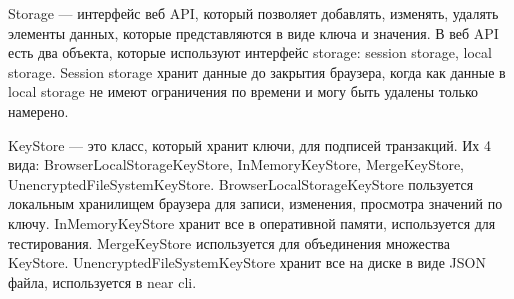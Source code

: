 \begin{figure}[H]
	\centering
    \caption{}
\end{figure}

\begin{definition}
    Storage --- интерфейс веб API, который позволяет добавлять, изменять, удалять элементы данных, которые представляются в виде ключа и значения\cite{webapistorage}. В веб API есть два объекта, которые используют интерфейс storage: session storage, local storage\cite{webapilocalstorage}. Session storage хранит данные до закрытия браузера, когда как данные в local storage не имеют ограничения по времени и могу быть удалены только намерено.
\end{definition}

\begin{definition}
    KeyStore\cite{nearclasskeystore} --- это класс, который хранит ключи, для подписей транзакций. Их 4 вида: BrowserLocalStorageKeyStore, InMemoryKeyStore, MergeKeyStore, UnencryptedFileSystemKeyStore. BrowserLocalStorageKeyStore пользуется локальным хранилищем браузера для записи, изменения, просмотра значений по ключу. InMemoryKeyStore хранит все в оперативной памяти, используется для тестирования. MergeKeyStore используется для объединения множества KeyStore. UnencryptedFileSystemKeyStore хранит все на диске в виде JSON файла, используется в near cli\cite{nearcli}.
\end{definition}

